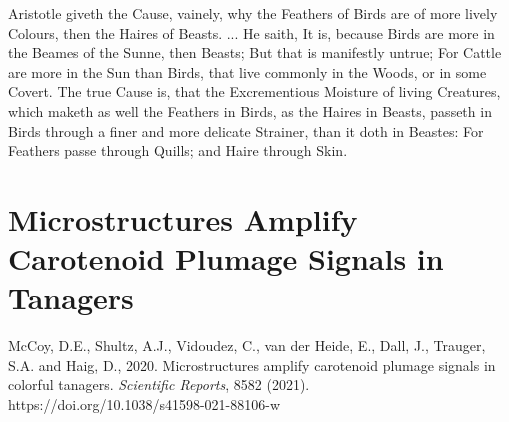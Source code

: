 \begin{savequote}[90mm]
Aristotle giveth the Cause, vainely, why the Feathers of Birds are of more lively Colours, then the Haires of Beasts. ... He saith, It is, because Birds are more in the Beames of the Sunne, then Beasts; But that is manifestly untrue; For Cattle are more in the Sun than Birds, that live commonly in the Woods, or in some Covert. The true Cause is, that the Excrementious Moisture of living Creatures, which maketh as well the Feathers in Birds, as the Haires in Beasts, passeth in Birds through a finer and more delicate Strainer, than it doth in Beastes: For Feathers passe through Quills; and Haire through Skin.
\end{savequote}

\chapter{Microstructures Amplify Carotenoid Plumage Signals in Tanagers}

\newthought{\textcolor{SchoolColor}{Reprinted from:}}
McCoy, D.E., Shultz, A.J., Vidoudez, C., van der Heide, E., Dall, J., Trauger, S.A. and Haig, D., 2020. Microstructures amplify carotenoid plumage signals in colorful tanagers. \emph{Scientific Reports},  8582 (2021).
\\
\newthought{\textcolor{SchoolColor}{Article and supplement available at:}}  https://doi.org/10.1038/s41598-021-88106-w
